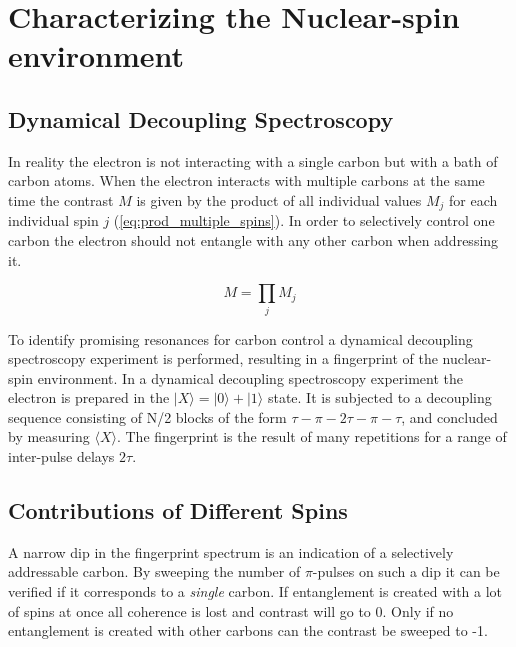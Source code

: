 \section{Characterizing the Nuclear-spin environment}
\subsection*{Dynamical Decoupling Spectroscopy}
In reality the electron is not interacting with a single carbon but with a bath of carbon atoms. When the electron interacts with multiple carbons at the same time the contrast $M$ is given by the product of all individual values $M_j$ for each individual spin $j$ (\cref{eq:prod_multiple_spins}). In order to selectively control one carbon the electron should not entangle with any other carbon when addressing it.

\begin{equation}
\label{eq:prod_multiple_spins}
    M = \prod_{j}{M_j}
\end{equation}

To identify promising resonances for carbon control a dynamical decoupling spectroscopy experiment is performed, resulting in a fingerprint of the nuclear-spin environment\citep{Taminiau2012Detection}.
In a dynamical decoupling spectroscopy experiment the electron is prepared in the $|X\rangle = |0\rangle +|1\rangle$ state. It is subjected to a decoupling sequence consisting of N/2 blocks of the form {$\tau - \pi -2\tau-\pi-\tau$}, and concluded by measuring $\langle X\rangle $. The fingerprint is the result of many repetitions for a range of inter-pulse delays $2\tau$.

\subsection*{Contributions of Different Spins }%

A narrow dip in the fingerprint spectrum is an indication of a selectively addressable carbon.
By sweeping the number of $\pi$-pulses on such a dip it can be verified if it corresponds to a \emph{single} carbon.
If entanglement is created with a lot of spins at once all coherence is lost and contrast will go to 0.
Only if no entanglement is created with other carbons can the contrast be sweeped to -1. %

